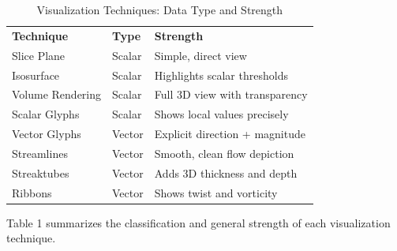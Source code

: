\documentclass[11pt]{article}
\begin{document}
\begin{table}[H]
	\centering
	\caption{Visualization Techniques: Data Type and Strength}
	\renewcommand{\arraystretch}{1.3}
	\begin{tabular}{|l|l|l|}
		\hline
		\textbf{Technique} & \textbf{Type} & \textbf{Strength}              \\
		
		Slice Plane        & Scalar        & Simple, direct view            \\
		
		Isosurface         & Scalar        & Highlights scalar thresholds   \\
		
		Volume Rendering   & Scalar        & Full 3D view with transparency \\
		
		Scalar Glyphs      & Scalar        & Shows local values precisely   \\
		
		Vector Glyphs      & Vector        & Explicit direction + magnitude \\
		
		Streamlines        & Vector        & Smooth, clean flow depiction   \\
		
		Streaktubes        & Vector        & Adds 3D thickness and depth    \\
		
		Ribbons            & Vector        & Shows twist and vorticity      \\
		\hline
	\end{tabular}
\end{table}
	
\noindent Table 1 summarizes the classification and general strength of each visualization technique.
	
\vspace{3em}
	
\end{document}
